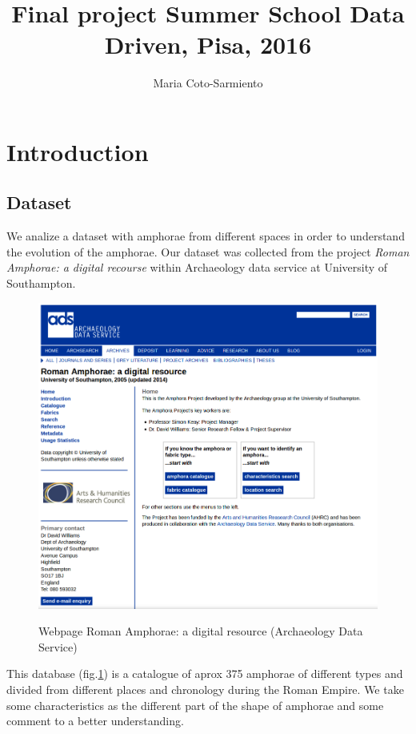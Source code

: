 \documentclass[10pt,a4paper]{article}
\author{Maria Coto-Sarmiento}
\title{Final project Summer School Data Driven, Pisa, 2016}
\begin{document}
\maketitle

\section{Introduction}


\subsection{Dataset}

We analize a dataset with amphorae from different spaces in order to understand the evolution of the amphorae. Our dataset was collected from the project \emph{Roman Amphorae: a digital recourse} within Archaeology data service at University of Southampton. \\

\begin{figure}[hbp]
	\centering
\includegraphics[scale=0.30]{picture1.png}
\label{picwebarch}
\caption{Webpage Roman Amphorae: a digital resource (Archaeology Data Service)}
\end{figure} 


This database (fig.\ref{picwebarch}) is a catalogue of aprox 375 amphorae of different types and divided from different places and chronology during the Roman Empire. We take some characteristics as the different part of the shape of amphorae and some comment to a better understanding. 
\end{document}
